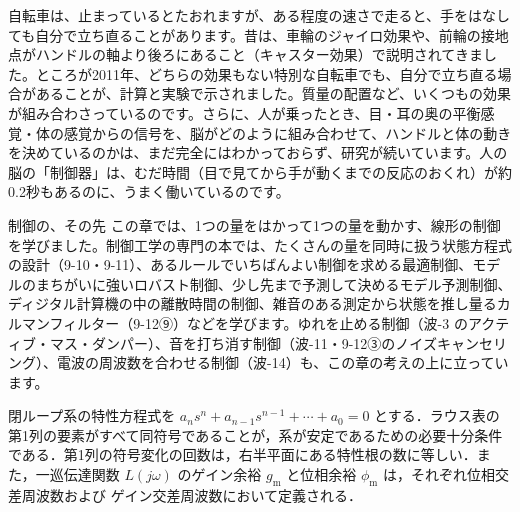 \begin{phmada}[自転車のバランスのとり方]
自転車は、止まっているとたおれますが、ある程度の速さで走ると、手をはなしても自分で立ち直ることがあります。昔は、車輪のジャイロ効果や、前輪の接地点がハンドルの軸より後ろにあること（キャスター効果）で説明されてきました。ところが2011年、どちらの効果もない特別な自転車でも、自分で立ち直る場合があることが、計算と実験で示されました。質量の配置など、いくつもの効果が組み合わさっているのです。さらに、人が乗ったとき、目・耳の奥の平衡感覚・体の感覚からの信号を、脳がどのように組み合わせて、ハンドルと体の動きを決めているのかは、まだ完全にはわかっておらず、研究が続いています。人の脳の「制御器」は、むだ時間（目で見てから手が動くまでの反応のおくれ）が約0.2秒もあるのに、うまく働いているのです。
\end{phmada}

\begin{phsaki}{制御の、その先}
この章では、1つの量をはかって1つの量を動かす、線形の制御を学びました。制御工学の専門の本では、たくさんの量を同時に扱う状態方程式の設計（9-10・9-11）、あるルールでいちばんよい制御を求める最適制御、モデルのまちがいに強いロバスト制御、少し先まで予測して決めるモデル予測制御、ディジタル計算機の中の離散時間の制御、雑音のある測定から状態を推し量るカルマンフィルター（9-12⑨）などを学びます。ゆれを止める制御（波-3 のアクティブ・マス・ダンパー）、音を打ち消す制御（波-11・9-12③のノイズキャンセリング）、電波の周波数を合わせる制御（波-14）も、この章の考えの上に立っています。
\end{phsaki}

\begin{senmonsho}[制御工学の専門書の書き方]
\begin{bkhonbun}
閉ループ系の特性方程式を $a_ns^n+a_{n-1}s^{n-1}+\cdots+a_0=0$ とする．ラウス表の第1列の要素がすべて同符号であることが，系が安定であるための必要十分条件である．第1列の符号変化の回数は，右半平面にある特性根の数に等しい．また，一巡伝達関数 $L(j\omega)$ のゲイン余裕 $g_{\mathrm m}$ と位相余裕 $\phi_{\mathrm m}$ は，それぞれ位相交差周波数および ゲイン交差周波数において定義される．
\end{bkhonbun}
\end{senmonsho}

